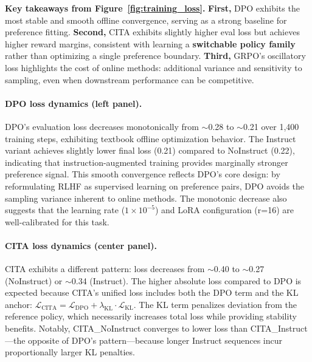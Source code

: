 \vspace{-0.35em}
\noindent\textbf{Key takeaways from Figure~\ref{fig:training_loss}.}
\textbf{First,} DPO exhibits the most stable and smooth offline convergence, serving as a strong baseline for preference fitting.
\textbf{Second,} \textsc{CITA} exhibits slightly higher eval loss but achieves higher reward margins, consistent with learning a \textbf{switchable policy family} rather than optimizing a single preference boundary.
\textbf{Third,} GRPO's oscillatory loss highlights the cost of online methods: additional variance and sensitivity to sampling, even when downstream performance can be competitive.

\paragraph{DPO loss dynamics (left panel).}
DPO's evaluation loss decreases monotonically from $\sim$0.28 to $\sim$0.21 over 1,400 training steps, exhibiting textbook offline optimization behavior.
The Instruct variant achieves slightly lower final loss (0.21) compared to NoInstruct (0.22), indicating that instruction-augmented training provides marginally stronger preference signal.
This smooth convergence reflects DPO's core design: by reformulating RLHF as supervised learning on preference pairs, DPO avoids the sampling variance inherent to online methods.
The monotonic decrease also suggests that the learning rate ($1 \times 10^{-5}$) and LoRA configuration (r=16) are well-calibrated for this task.

\paragraph{\textsc{CITA} loss dynamics (center panel).}
\textsc{CITA} exhibits a different pattern: loss decreases from $\sim$0.40 to $\sim$0.27 (NoInstruct) or $\sim$0.34 (Instruct).
The higher absolute loss compared to DPO is expected because \textsc{CITA}'s unified loss includes both the DPO term and the KL anchor: $\mathcal{L}_{\text{CITA}} = \mathcal{L}_{\text{DPO}} + \lambda_{\text{KL}} \cdot \mathcal{L}_{\text{KL}}$.
The KL term penalizes deviation from the reference policy, which necessarily increases total loss while providing stability benefits.
Notably, \textsc{CITA}\_NoInstruct converges to lower loss than \textsc{CITA}\_Instruct---the opposite of DPO's pattern---because longer Instruct sequences incur proportionally larger KL penalties.

